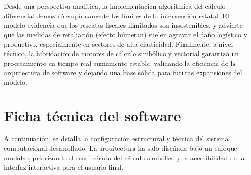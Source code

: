 \documentclass[12pt, a4paper]{article}
\begin{document}
Desde una perspectiva analítica, la implementación algorítmica del cálculo diferencial demostró empíricamente los límites de la intervención estatal. El modelo evidencia que los rescates fiscales ilimitados son insostenibles, y advierte que las medidas de retaliación (efecto búmeran) suelen agravar el daño logístico y productivo, especialmente en sectores de alta elasticidad. Finalmente, a nivel técnico, la hibridación de motores de cálculo simbólico y vectorial garantizó un procesamiento en tiempo real sumamente estable, validando la eficiencia de la arquitectura de software y dejando una base sólida para futuras expansiones del modelo.

\newpage
\section{Ficha técnica del software}

A continuación, se detalla la configuración estructural y técnica del sistema computacional desarrollado. La arquitectura ha sido diseñada bajo un enfoque modular, priorizando el rendimiento del cálculo simbólico y la accesibilidad de la interfaz interactiva para el usuario final.
\end{document}
